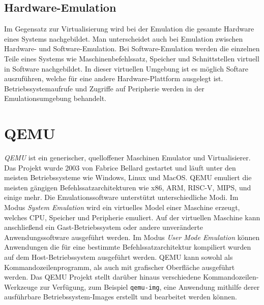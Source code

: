 \subsection{Hardware-Emulation}

Im Gegensatz zur Virtualisierung wird bei der Emulation die gesamte Hardware
eines Systems nachgebildet.
Man unterscheidet auch bei Emulation zwischen Hardware- und Software-Emulation.
Bei Software-Emulation werden die einzelnen Teile eines Systems wie
Maschinenbefehlssatz, Speicher und Schnittstellen virtuell in Software
nachgebildet\cite{BSKompakt_Virt}.
In dieser virtuellen Umgebung ist es möglich Softare auszuführen, welche
für eine andere Hardware-Plattform ausgelegt ist\cite{BSKompakt_Virt}.
Betriebssystemaufrufe und Zugriffe auf Peripherie werden in der
Emulationsumgebung behandelt.


\section{QEMU}

\textit{QEMU} ist ein generischer, quelloffener Maschinen Emulator und
Virtualisierer\cite{QemuAbout}.
Das Projekt wurde 2003 von Fabrice Bellard gestartet und läuft unter den
meisten Betriebssysteme wie Windows, Linux und MacOS.
QEMU emuliert die meisten gängigen Befehlssatzarchitekturen wie x86, ARM,
RISC-V, MIPS, und einige mehr\cite{WikiQemu}.
Die Emulationssoftware unterstützt unterschiedliche Modi.
Im Modus \textit{System Emulation} wird ein virtuelles Model einer Maschine
erzeugt, welches CPU, Speicher und Peripherie emuliert.
Auf der virtuellen Maschine kann anschließend ein Gast-Betriebssystem oder
andere unveränderte Anwendungssoftware ausgeführt werden.
\newline
Im Modus \textit{User Mode Emulation} können Anwendungen die für eine bestimmte
Befehlssatzarchitektur kompiliert wurden auf dem Host-Betriebssystem ausgeführt
werden.
\newline
QEMU kann sowohl als Kommandozeilenprogramm, als auch mit grafischer Oberfläche
ausgeführt werden.
Das QEMU Projekt stellt darüber hinaus verschiedene Kommandozeilen-Werkzeuge
zur Verfügung, zum Beispiel \texttt{qemu-img}, eine Anwendung mithilfe derer
ausführbare Betriebssystem-Images erstellt und bearbeitet werden können.

%
